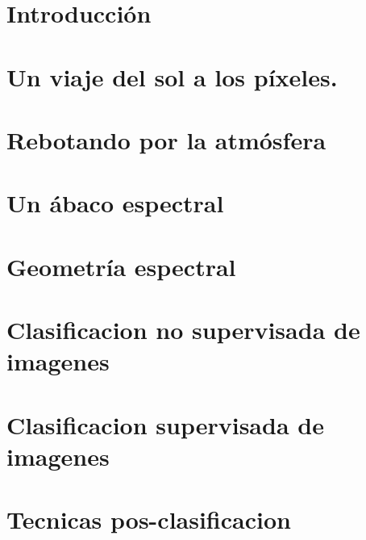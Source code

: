\documentclass[a4paper]{article}
\begin{document}
\section*{Introducción}
\label{sec:intro}
\newpage
\section{Un viaje del sol a los p\'ixeles.}
\label{viaje}

\newpage

\section{Rebotando por la atm\'osfera}
\label{rebotando}

\newpage

\section{Un \'abaco espectral}
\label{abaco}

\newpage

\section{Geometr\'ia espectral}
\label{rotaciones}

\newpage

\section{Clasificacion no supervisada de imagenes}
\label{otrolado}

\newpage

\section{Clasificacion supervisada de imagenes}
\label{educando}

\newpage


\section{Tecnicas pos-clasificacion}
\label{pos}

\newpage
\end{document}
